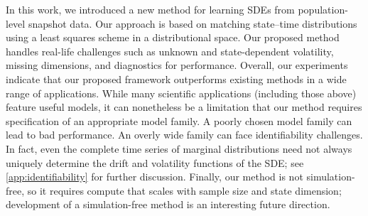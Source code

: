 In this work, we introduced a new method for learning SDEs from population-level snapshot data. Our approach is based on matching state--time distributions using a least squares scheme in a distributional space. Our proposed method handles real-life challenges such as unknown and state-dependent volatility, missing dimensions, and diagnostics for performance. Overall, our experiments indicate that our proposed framework outperforms existing methods in a wide range of applications. While many scientific applications (including those above) feature useful models, it can nonetheless be a limitation that our method requires specification of an appropriate model family. A poorly chosen model family can lead to bad performance. An overly wide family can face identifiability challenges. In fact, even the complete time series of marginal distributions need not always uniquely determine the drift and volatility functions of the SDE; see \cref{app:identifiability} for further discussion. Finally, our method is not simulation-free, so it requires compute that scales with sample size and state dimension; development of a simulation-free method is an interesting future direction.

